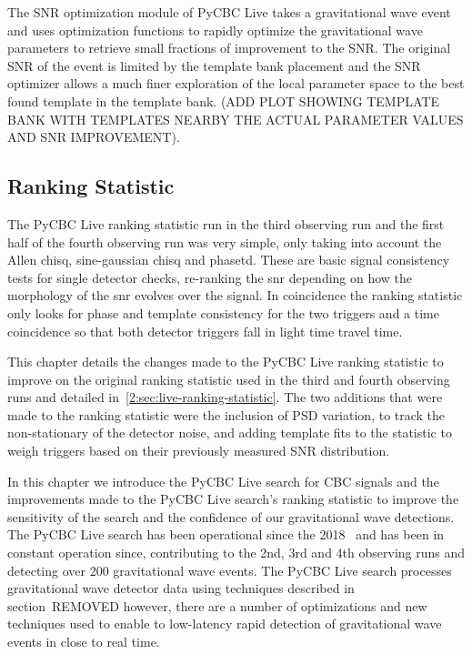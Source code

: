 The SNR optimization module of PyCBC Live takes a gravitational wave event and uses optimization functions to rapidly optimize the gravitational wave parameters to retrieve small fractions of improvement to the SNR. The original SNR of the event is limited by the template bank placement and the SNR optimizer allows a much finer exploration of the local parameter space to the best found template in the template bank. (ADD PLOT SHOWING TEMPLATE BANK WITH TEMPLATES NEARBY THE ACTUAL PARAMETER VALUES AND SNR IMPROVEMENT).

\subsection{\label{2:sec:live-ranking-statistic}Ranking Statistic}

The PyCBC Live ranking statistic run in the third observing run and the first half of the fourth observing run was very simple, only taking into account the Allen chisq, sine-gaussian chisq and phasetd. These are basic signal consistency tests for single detector checks, re-ranking the snr depending on how the morphology of the snr evolves over the signal. In coincidence the ranking statistic only looks for phase and template consistency for the two triggers and a time coincidence so that both detector triggers fall in light time travel time.



This chapter details the changes made to the PyCBC Live ranking statistic to improve on the original ranking statistic used in the third and fourth observing runs and detailed in~\ref{2:sec:live-ranking-statistic}. The two additions that were made to the ranking statistic were the inclusion of PSD variation, to track the non-stationary of the detector noise, and adding template fits to the statistic to weigh triggers based on their previously measured SNR distribution.

In this chapter we introduce the PyCBC Live search for CBC signals and the improvements made to the PyCBC Live search's ranking statistic to improve the sensitivity of the search and the confidence of our gravitational wave detections. The PyCBC Live search has been operational since the 2018~\cite{PyCBC_Live:2018} and has been in constant operation since, contributing to the 2nd, 3rd and 4th observing runs and detecting over 200 gravitational wave events. The PyCBC Live search processes gravitational wave detector data using techniques described in section~REMOVED however, there are a number of optimizations and new techniques used to enable to low-latency rapid detection of gravitational wave events in close to real time.

